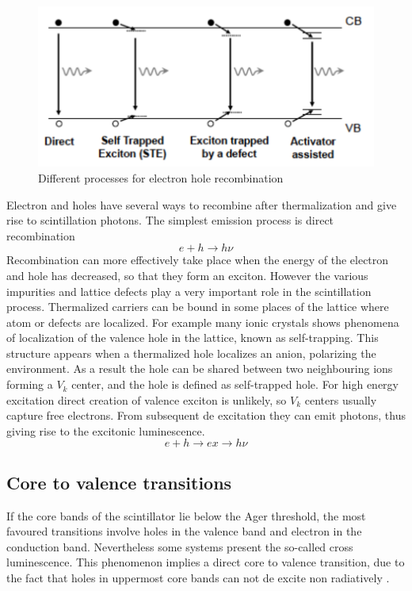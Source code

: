 \begin{figure}
\centering
\includegraphics[width=12cm]{../Pictures/Chapter_2/traps.pdf}
\caption[Electron hole recombination]{Different processes for electron hole recombination}
\label{fig:traps}
\end{figure}
Electron and holes have several ways to recombine after thermalization and give rise to scintillation photons.
The simplest emission process is direct recombination
\begin{equation}
e + h \rightarrow h\nu
\end{equation}
Recombination can more effectively take place when the energy of the electron and hole has decreased, so that they form an exciton. 
However the various impurities and lattice defects play a very important role in the scintillation process. Thermalized carriers can be bound in some places of the lattice where atom or defects are localized. 
For example many ionic crystals shows phenomena of localization of the valence hole in the lattice, known as self-trapping. This structure appears when a thermalized hole localizes an anion, polarizing the environment. As a result the hole can be shared between two neighbouring ions forming a $V_{k}$ center, and the hole is defined as self-trapped hole. For high energy excitation direct creation of valence exciton is unlikely, so $V_{k}$ centers usually capture free electrons. From subsequent de excitation they can emit photons, thus giving rise to the excitonic luminescence.
\begin{equation} 
e + h \rightarrow ex \rightarrow h\nu
\end{equation}

\subsection{Core to valence transitions}

If the core bands of the scintillator lie below the Ager threshold, the most favoured transitions involve holes in the valence band and electron in the conduction band. Nevertheless some systems present the so-called cross luminescence. This phenomenon implies a direct core to valence transition, due to the fact that holes in uppermost core bands can not de excite non radiatively \cite{Lecoq2006}. 

